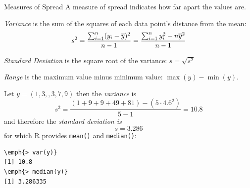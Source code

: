 \documentclass[xcolor=svgnames, 10pt]{beamer}
\begin{document}
\begin{frame}[fragile]{Measures of Spread}
A measure of spread indicates how far apart the values are.
\begin{definition}[Variance]
\emph{Variance} is the sum of the squares of each data point's distance from the mean:
$$s^2 = \frac{\sum_{i=1}^n (y_i-\overline{y})^2}{n-1} = \frac{\sum_{i=1}^n y_i^2 - n\overline{y}^2}{n-1}$$
\end{definition}

\begin{definition}
\emph{Standard Deviation} is the square root of the variance: $s = \sqrt{s^2}$
\end{definition}

\begin{definition}[Range]
\emph{Range} is the maximum value minus minimum value: $\max(y) - \min(y)$.
\end{definition}
\end{frame}


\begin{frame}[fragile]
\begin{example}
Let $y = (1, 3, ,3,7, 9)$ then the \emph{variance} is
$$s^2 = \frac{(1+9+9+49+81)-(5 \cdot 4.6^2)}{5-1} = 10.8$$
and therefore the \emph{standard deviation is}
$$s = 3.286$$
for which R provides \texttt{mean()} and \texttt{median()}:
\begin{Verbatim}[commandchars=\\\{\}, xleftmargin=2em]
\emph{> var(y)}
[1] 10.8
\emph{> median(y)}
[1] 3.286335
\end{Verbatim}
\end{example}
\end{frame}
\end{document}
